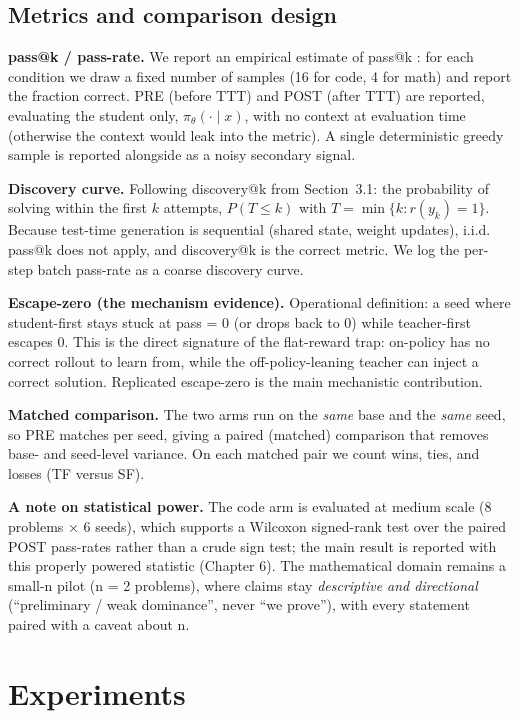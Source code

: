 \documentclass[12pt,a4paper]{report}
\begin{document}
\section{Metrics and comparison design}\label{metrics-and-comparison-design}

\textbf{pass@k / pass-rate.} We report an empirical estimate of pass@k \cite{r9}: for each condition we draw a fixed number of samples (16 for code, 4 for math) and report the fraction correct. PRE (before TTT) and POST (after TTT) are reported, evaluating the student only, \(\pi_\theta(\cdot\mid x)\), with no context at evaluation time (otherwise the context would leak into the metric). A single deterministic greedy sample is reported alongside as a noisy secondary signal.

\textbf{Discovery curve.} Following discovery@k \cite{r1} from Section~3.1: the probability of solving within the first \(k\) attempts, \(P(T \le k)\) with \(T = \min\{k : r(y_k) = 1\}\). Because test-time generation is sequential (shared state, weight updates), i.i.d. pass@k does not apply, and discovery@k is the correct metric. We log the per-step batch pass-rate as a coarse discovery curve.

\textbf{Escape-zero (the mechanism evidence).} Operational definition: a seed where student-first stays stuck at pass = 0 (or drops back to 0) while teacher-first escapes 0. This is the direct signature of the flat-reward trap: on-policy has no correct rollout to learn from, while the off-policy-leaning teacher can inject a correct solution. Replicated escape-zero is the main mechanistic contribution.

\textbf{Matched comparison.} The two arms run on the \emph{same} base and the \emph{same} seed, so PRE matches per seed, giving a paired (matched) comparison that removes base- and seed-level variance. On each matched pair we count wins, ties, and losses (TF versus SF).

\textbf{A note on statistical power.} The code arm is evaluated at medium scale (8 problems × 6 seeds), which supports a Wilcoxon signed-rank test over the paired POST pass-rates rather than a crude sign test; the main result is reported with this properly powered statistic (Chapter 6). The mathematical domain remains a small-n pilot (n = 2 problems), where claims stay \emph{descriptive and directional} (``preliminary / weak dominance'', never ``we prove''), with every statement paired with a caveat about n.

\chapter{Experiments}\label{chapter-4-experiments}
\end{document}
